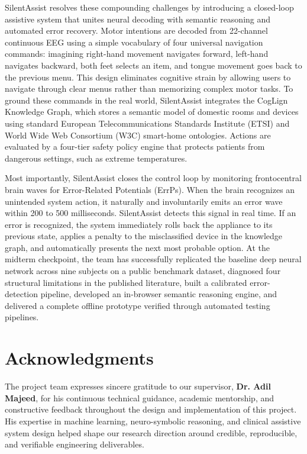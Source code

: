 \documentclass[12pt,a4paper]{report}
\begin{document}
SilentAssist resolves these compounding challenges by introducing a closed-loop assistive system that unites neural decoding with semantic reasoning and automated error recovery. Motor intentions are decoded from 22-channel continuous EEG using a simple vocabulary of four universal navigation commands: imagining right-hand movement navigates forward, left-hand navigates backward, both feet selects an item, and tongue movement goes back to the previous menu. This design eliminates cognitive strain by allowing users to navigate through clear menus rather than memorizing complex motor tasks. To ground these commands in the real world, SilentAssist integrates the CogLign Knowledge Graph, which stores a semantic model of domestic rooms and devices using standard European Telecommunications Standards Institute (ETSI) and World Wide Web Consortium (W3C) smart-home ontologies. Actions are evaluated by a four-tier safety policy engine that protects patients from dangerous settings, such as extreme temperatures.

Most importantly, SilentAssist closes the control loop by monitoring frontocentral brain waves for Error-Related Potentials (ErrPs). When the brain recognizes an unintended system action, it naturally and involuntarily emits an error wave within 200 to 500 milliseconds. SilentAssist detects this signal in real time. If an error is recognized, the system immediately rolls back the appliance to its previous state, applies a penalty to the misclassified device in the knowledge graph, and automatically presents the next most probable option. At the midterm checkpoint, the team has successfully replicated the baseline deep neural network across nine subjects on a public benchmark dataset, diagnosed four structural limitations in the published literature, built a calibrated error-detection pipeline, developed an in-browser semantic reasoning engine, and delivered a complete offline prototype verified through automated testing pipelines.

\newpage
\chapter*{Acknowledgments}

The project team expresses sincere gratitude to our supervisor, \textbf{Dr. Adil Majeed}, for his continuous technical guidance, academic mentorship, and constructive feedback throughout the design and implementation of this project. His expertise in machine learning, neuro-symbolic reasoning, and clinical assistive system design helped shape our research direction around credible, reproducible, and verifiable engineering deliverables.
\end{document}
